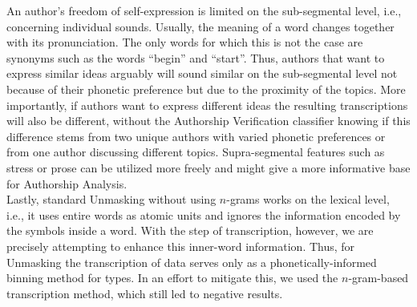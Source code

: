 An author's freedom of self-expression is limited on the sub-segmental level, i.e., concerning individual sounds.
Usually, the meaning of a word changes together with its pronunciation.
The only words for which this is not the case are synonyms such as the words ``begin'' and ``start''.
Thus, authors that want to express similar ideas arguably will sound similar on the sub-segmental level not because of their phonetic preference but due to the proximity of the topics.
More importantly, if authors want to express different ideas the resulting transcriptions will also be different, without the Authorship Verification classifier knowing if this difference stems from two unique authors with varied phonetic preferences or from one author discussing different topics.
Supra-segmental features such as stress or prose can be utilized more freely and might give a more informative base for Authorship Analysis.\\
Lastly, standard Unmasking without using $n$-grams works on the lexical level, i.e., it uses entire words as atomic units and ignores the information encoded by the symbols inside a word.
With the step of transcription, however, we are precisely attempting to enhance this inner-word information.
Thus, for Unmasking the transcription of data serves only as a phonetically-informed binning method for types.
In an effort to mitigate this, we used the $n$-gram-based transcription method, which still led to negative results.\\